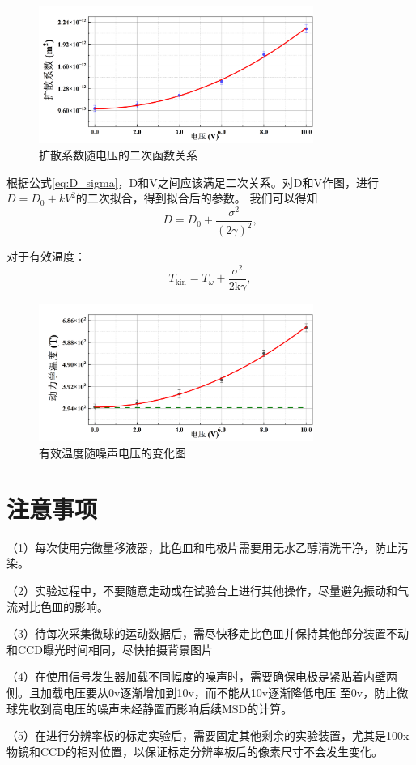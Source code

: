 \documentclass[a4paper]{report} %
\begin{document}
\begin{figure}[H]
    \centering
    \includegraphics[width=0.8\textwidth]{二次拟合.png}
    \caption{扩散系数随电压的二次函数关系}
    \label{fig:trends}
\end{figure}
根据公式\eqref{eq:D_sigma}，D和V之间应该满足二次关系。对D和V作图，进行$D = D_0 + kV^2$的二次拟合，得到拟合后的参数。
我们可以得知
\begin{equation}
    D = D_0 + \frac{\sigma^2}{(2\gamma)^2},
\end{equation}

对于有效温度：
\begin{equation}
    T_{\text{kin}} = T_{\omega} + \frac{\sigma^2}{2\text{k}\gamma},
\end{equation}


\begin{figure}[H]
    \centering
    \includegraphics[width=0.8\textwidth]{有效温度.png}
    \caption{有效温度随噪声电压的变化图}
    \label{fig:fit2V}
\end{figure}



\section{注意事项}
（1）每次使用完微量移液器，比色皿和电极片需要用无水乙醇清洗干净，防止污染。\par
（2）实验过程中，不要随意走动或在试验台上进行其他操作，尽量避免振动和气流对比色皿的影响。\par
（3）待每次采集微球的运动数据后，需尽快移走比色皿并保持其他部分装置不动和CCD曝光时间相同，尽快拍摄背景图片 \par
（4）在使用信号发生器加载不同幅度的噪声时，需要确保电极是紧贴着内壁两侧。且加载电压要从0v逐渐增加到10v，而不能从10v逐渐降低电压
至0v，防止微球先收到高电压的噪声未经静置而影响后续MSD的计算。\par
（5）在进行分辨率板的标定实验后，需要固定其他剩余的实验装置，尤其是100x物镜和CCD的相对位置，以保证标定分辨率板后的像素尺寸不会发生变化。\par
\end{document}
